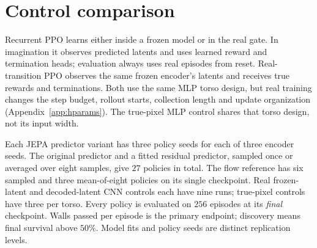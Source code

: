 \section{Control comparison}
\label{sec:controllers}

Recurrent PPO \citep{schulman2017ppo,espeholt2018impala,farebrother2024stopregressing} learns either
inside a frozen model or in the real gate. In imagination it observes predicted latents and uses
learned reward and termination heads; evaluation always uses real episodes from reset.
Real-transition PPO observes the same frozen encoder's latents and receives true rewards and
terminations. Both use the same MLP torso design, but real training changes the step budget,
rollout starts, collection length and update organization (Appendix~\ref{app:hparams}).
The true-pixel MLP control shares that torso design, not its input width.

Each JEPA predictor variant has three policy seeds for each of three encoder seeds.
The original predictor and a fitted residual predictor, sampled once or averaged over eight samples,
give $27$ policies in total. The flow reference has six sampled and three mean-of-eight policies
on its single checkpoint. Real frozen-latent and decoded-latent CNN controls each have nine runs;
true-pixel controls have three per torso. Every policy is evaluated on $256$ episodes at its
\emph{final} checkpoint. Walls passed per episode is the primary endpoint; discovery means final
survival above $50\%$. Model fits and policy seeds are distinct replication levels.
